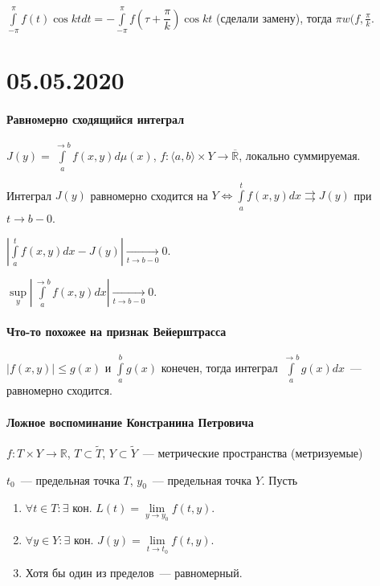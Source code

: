 \documentclass{article}
\begin{document}
            $\int\limits^{\pi}_{-\pi} f(t) \cos {kt} dt = - \int\limits^{\pi}_{-\pi} f(\tau + \dfrac{\pi}{k}) \cos {kt}$ (сделали замену), тогда $\pi w(f, \frac{\pi}{k}$.
            
\newpage

\part{05.05.2020}
    
    \subsection{Равномерно сходящийся интеграл}
    
        $J(y) = \int\limits^{\rightarrow b}_a f(x, y) d \mu (x)$, $f : \langle a, b \rangle \times Y \rightarrow \overline{\mathbb{R}}$, локально суммируемая.
        
        Интеграл $J(y)$ равномерно сходится на $Y \Longleftrightarrow \int\limits^t_a f(x, y) dx \rightrightarrows J(y)$ при $t \rightarrow b - 0$.
        
        $\left| \int\limits^t_a f(x, y) dx - J(y) \right| \xrightarrow[t \rightarrow b - 0]{} 0$.
        
        $\sup\limits_y \left| \int\limits^{\rightarrow b}_a f(x, y) dx \right| \xrightarrow[t \rightarrow b - 0]{} 0$.
    
    \subsection{Что-то похожее на признак Вейерштрасса}
    
        $\left| f(x, y) \right| \leqslant g(x)$ и $\int\limits^b_a g(x)$ конечен, тогда интеграл $\int\limits^{\rightarrow b}_a g(x) dx$~--- равномерно сходится.
        
    \subsection{Ложное воспоминание Констранина Петровича}
    
        $f : T \times Y \rightarrow \mathbb{R}$, $T \subset \widetilde{T}$, $Y \subset \widetilde{Y}$~--- метрические пространства (метризуемые)
        
        $t_0$~--- предельная точка $T$, $y_0$~--- предельная точка $Y$. Пусть
        
        \begin{enumerate}
        
            \item $\forall t \in T : \exists \text{ кон. } L(t) = \lim\limits_{y \rightarrow y_0} f(t, y)$.
            
            \item $\forall y \in Y : \exists \text{ кон. } J(y) = \lim\limits_{t \rightarrow t_0} f(t, y)$.
            
            \item Хотя бы один из пределов~--- равномерный.
            
        \end{enumerate}
    
\end{document}

